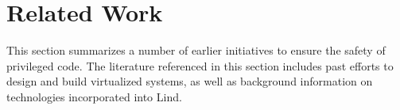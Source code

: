 \section{Related Work}
\label{sec.related_work}

This section summarizes a number of earlier initiatives to ensure the safety of privileged code.
The literature referenced in this section includes past efforts to design and build virtualized systems,
as well as background information on technologies incorporated into Lind.




